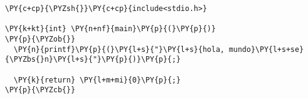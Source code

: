 \begin{Verbatim}[commandchars=\\\{\}]
\PY{c+cp}{\PYZsh{}}\PY{c+cp}{include<stdio.h>}

\PY{k+kt}{int} \PY{n+nf}{main}\PY{p}{(}\PY{p}{)}
\PY{p}{\PYZob{}}
  \PY{n}{printf}\PY{p}{(}\PY{l+s}{"}\PY{l+s}{hola, mundo}\PY{l+s+se}{\PYZbs{}n}\PY{l+s}{"}\PY{p}{)}\PY{p}{;}

  \PY{k}{return} \PY{l+m+mi}{0}\PY{p}{;}
\PY{p}{\PYZcb{}}
\end{Verbatim}
